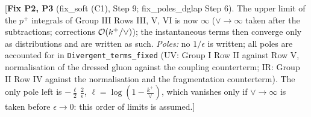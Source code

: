 {\color{red}[\textbf{Fix P2, P3} (fix\_soft (C1), Step 9; fix\_poles\_dglap Step 6). The upper limit of the $p^{+}$ integrals of Group III Rows III, V, VI is now $\infty$ ($\vee\to\infty$ taken after the subtractions; corrections ${\cal O}(k^{+}/\vee)$); the instantaneous terms then converge only as distributions and are written as such. \emph{Poles:} no $1/\epsilon$ is written; all poles are accounted for in \texttt{Divergent\_terms\_fixed} (UV: Group I Row II against Row V, normalisation of the dressed gluon against the coupling counterterm; IR: Group II Row IV against the normalisation and the fragmentation counterterm). The only pole left is $-\frac{\ell}{2}\,\frac{2}{\epsilon}$, $\ell=\log(1-\frac{k^{+}}{\vee})$, which vanishes only if $\vee\to\infty$ is taken before $\epsilon\to0$: this order of limits is assumed.]}\
